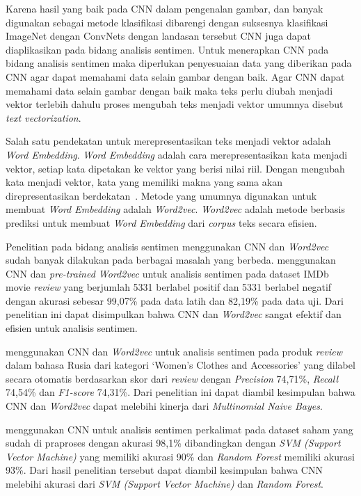 Karena hasil yang baik pada CNN dalam pengenalan gambar, dan banyak
digunakan sebagai metode klasifikasi dibarengi dengan suksesnya klasifikasi ImageNet dengan
ConvNets dengan landasan tersebut CNN juga dapat diaplikasikan pada bidang analisis sentimen.
Untuk menerapkan CNN pada bidang analisis sentimen maka diperlukan penyesuaian data yang diberikan
pada CNN agar dapat memahami data selain gambar dengan baik. Agar CNN dapat memahami data selain 
gambar dengan baik maka teks perlu diubah menjadi vektor terlebih dahulu proses mengubah teks
menjadi vektor umumnya disebut \emph{text vectorization}.

Salah satu pendekatan untuk merepresentasikan teks menjadi vektor adalah \emph{Word Embedding}.
\emph{Word Embedding} adalah cara merepresentasikan kata menjadi vektor, setiap kata dipetakan ke 
vektor yang berisi nilai riil. Dengan mengubah kata menjadi vektor, kata yang memiliki makna yang 
sama akan direpresentasikan berdekatan~\citep{Khattak2019}. Metode yang umumnya digunakan untuk
membuat \emph{Word Embedding} adalah \emph{Word2vec}. \emph{Word2vec} adalah metode berbasis prediksi 
untuk membuat \emph{Word Embedding} dari \emph{corpus} teks secara efisien.

Penelitian pada bidang analisis sentimen menggunakan CNN dan \emph{Word2vec} sudah banyak dilakukan pada 
berbagai masalah yang berbeda. \citet{Sharma2020} menggunakan CNN dan \emph{pre-trained Word2vec}
untuk analisis sentimen pada dataset IMDb movie \emph{review} yang berjumlah 5331 berlabel positif dan
5331 berlabel negatif dengan akurasi sebesar 99,07\% pada data latih dan 82,19\% pada data uji. Dari
penelitian ini dapat disimpulkan bahwa CNN dan \emph{Word2vec} sangat efektif dan efisien untuk 
analisis sentimen.

\citet{Smetanin2019} menggunakan CNN dan \emph{Word2vec} untuk analisis sentimen pada produk \emph{review} dalam
bahasa Rusia dari kategori `Women's Clothes and Accessories' yang dilabel secara otomatis berdasarkan skor dari \emph{review}
dengan \emph{Precision} 74,71\%, \emph{Recall} 74,54\% dan \emph{F1-score} 74,31\%. Dari penelitian ini dapat diambil kesimpulan
bahwa CNN dan \emph{Word2vec} dapat melebihi kinerja dari \emph{Multinomial Naive Bayes}.

\citet{Dong2020} menggunakan CNN untuk analisis sentimen perkalimat pada dataset saham yang sudah
di praproses dengan akurasi 98,1\% dibandingkan dengan \emph{SVM (Support Vector Machine)} yang 
memiliki akurasi 90\% dan \emph{Random Forest} memiliki akurasi 93\%. Dari hasil penelitian tersebut
dapat diambil kesimpulan bahwa CNN melebihi akurasi dari \emph{SVM (Support Vector Machine)} dan 
\emph{Random Forest}.

